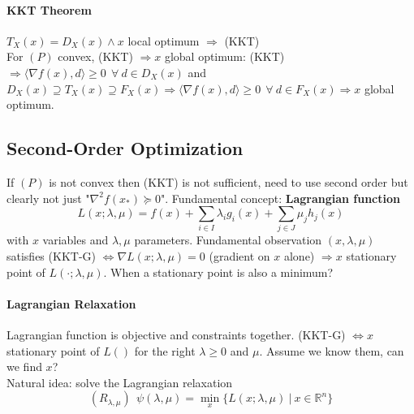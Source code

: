 \documentclass[10pt]{report}
\begin{document}
\paragraph{KKT Theorem} $T_X(x)=D_X(x)\wedge x$ local optimum $\Rightarrow$ (KKT)\\
For $(P)$ convex, (KKT) $\Rightarrow x$ global optimum: (KKT) $\Rightarrow \langle \nabla f(x), d\rangle \geq 0\:\:\forall\:d\in D_X(x)$ and $D_X(x)\supseteq T_X(x)\supseteq F_X(x) \Rightarrow\langle \nabla f(x), d\rangle \geq 0\:\:\forall\:d\in F_X(x)\Rightarrow x$ global optimum.
\subsection{Second-Order Optimization}
If $(P)$ is not convex then (KKT) is not sufficient, need to use second order but clearly not just "$\nabla^2 f(x_*)\succeq 0$". Fundamental concept: \textbf{Lagrangian function} $$L(x;\lambda, \mu)=f(x) + \sum_{i\in I} \lambda_ig_i(x) + \sum_{j\in J}\mu_jh_j(x)$$ with $x$ variables and $\lambda,\mu$ parameters. Fundamental observation $(x,\lambda,\mu)$ satisfies (KKT-G) $\Leftrightarrow \nabla L(x;\lambda,\mu) = 0$ (gradient on $x$ alone) $\Rightarrow x$ stationary point of $L(\cdot;\lambda,\mu)$. When a stationary point is also a minimum?
\paragraph{Lagrangian Relaxation} Lagrangian function is objective and constraints together. (KKT-G) $\Leftrightarrow x$ stationary point of $L()$ for the right $\lambda\geq 0$ and $\mu$. Assume we know them, can we find $x$?\\
Natural idea: solve the Lagrangian relaxation $$(R_{\lambda,\mu})\:\:\psi(\lambda,\mu) = \min_x\{L(x;\lambda, \mu)\:|\:x\in \mathbb{R}^n\}$$
\pagebreak
\end{document}

